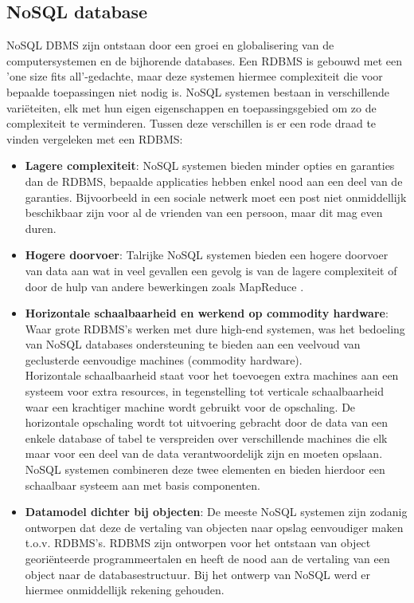 \subsection{NoSQL database\cite{Strauch.NoSQL}}\label{sec:eventualconsistency}
NoSQL DBMS zijn ontstaan door een groei en globalisering van de computersystemen en de bijhorende databases. Een RDBMS is gebouwd met een 'one size fits all'-gedachte, maar deze systemen hiermee complexiteit die voor bepaalde toepassingen niet nodig is. NoSQL systemen bestaan in verschillende variëteiten, elk met hun eigen eigenschappen en toepassingsgebied om zo de complexiteit te verminderen. Tussen deze verschillen is er een rode draad te vinden vergeleken met een RDBMS:
\begin{itemize}
	\item \textbf{Lagere complexiteit}: NoSQL systemen bieden minder opties en garanties dan de RDBMS, bepaalde applicaties hebben enkel nood aan een deel van de garanties. Bijvoorbeeld in een sociale netwerk moet een post niet onmiddellijk beschikbaar zijn voor al de vrienden van een persoon, maar dit mag even duren.
	\item \textbf{Hogere doorvoer}: Talrijke NoSQL systemen bieden een hogere doorvoer van data aan wat in veel gevallen een gevolg is van de lagere complexiteit of door de hulp van andere bewerkingen zoals MapReduce \cite{dean2008mapreduce}.
	
	\item \textbf{Horizontale schaalbaarheid en werkend op commodity hardware}: Waar grote RDBMS's werken met dure high-end systemen, was het bedoeling van NoSQL databases ondersteuning te bieden aan een veelvoud van geclusterde eenvoudige machines (commodity hardware). \\
	Horizontale schaalbaarheid staat voor het toevoegen extra machines aan een systeem voor extra resources, in tegenstelling tot verticale schaalbaarheid waar een krachtiger machine wordt gebruikt voor de opschaling. De horizontale opschaling wordt tot uitvoering gebracht door de data van een enkele database of tabel te verspreiden over verschillende machines die elk maar voor een deel van de data verantwoordelijk zijn en moeten opslaan.\\
	NoSQL systemen combineren deze twee elementen en bieden hierdoor een schaalbaar systeem aan met basis componenten.
	\item \textbf{Datamodel dichter bij objecten}: De meeste NoSQL systemen zijn zodanig ontworpen dat deze de vertaling van objecten naar opslag eenvoudiger maken t.o.v. RDBMS's. RDBMS zijn ontworpen voor het ontstaan van object georiënteerde programmeertalen en heeft de nood aan de vertaling van een object naar de databasestructuur. Bij het ontwerp van NoSQL werd er hiermee onmiddellijk rekening gehouden.  
\end{itemize}  \noindent
